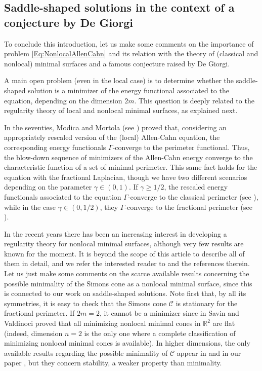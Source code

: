 \documentclass[12pt,reqno]{amsart}
\theoremstyle{definition}
\theoremstyle{remark}
\newcommand{\con}[1]{\mathbb{#1}}
\newcommand{\R}{\con{R}} %
\newcommand{\ccal}{\mathscr{C}}
\newcommand{\s}{\gamma}
\numberwithin{equation}{section}
\begin{document}
\subsection{Saddle-shaped solutions in the context of a conjecture by De Giorgi}
\label{Subsec:DeGiorgi}

To conclude this introduction, let us make some comments on the importance of problem \eqref{Eq:NonlocalAllenCahn} and its relation with the theory of (classical and nonlocal) minimal surfaces and a famous conjecture raised by De Giorgi.

A main open problem (even in the local case) is to determine whether the saddle-shaped solution is a minimizer of the energy functional associated to the equation, depending on the dimension $2m$. This question is deeply related to the regularity theory of local and nonlocal minimal surfaces, as explained next.

In the seventies, Modica and Mortola (see \cite{Modica,ModicaMortola}) proved that, considering an appropriately rescaled version of the (local) Allen-Cahn equation, the corresponding energy functionals $\Gamma$-converge to the perimeter functional. Thus, the blow-down sequence of minimizers of the Allen-Cahn energy converge to the characteristic function of a set of minimal perimeter. This same fact holds for the equation with the fractional Laplacian, though we have two different scenarios depending on the parameter $\s \in (0,1)$. If $\s \geq 1/2$, the rescaled energy functionals associated to the equation $\Gamma$-converge to the classical perimeter (see \cite{GiovanniBouchitteSeppecher,Gonzalez}), while in the case $\s \in (0,1/2)$, they $\Gamma$-converge to the fractional perimeter (see \cite{SavinValdinoci-GammaConvergence}). 

In the recent years there has been an increasing interest in developing a regularity theory for nonlocal minimal surfaces, although very few results are known for the moment. It is beyond the scope of this article to describe all of them in detail, and we refer the interested reader to \cite{CozziFigalli-Survey, BucurValdinoci} and the references therein. Let us just make some comments on the scarce available results concerning the possible minimality of the Simons cone as a nonlocal minimal surface, since this is connected to our work on saddle-shaped solutions. Note first that, by all its symmetries, it is easy to check that the Simons cone $\ccal$ is stationary for the fractional perimeter. If $2m=2$, it cannot be a minimizer since in \cite{SavinValdinoci-Cones} Savin and Valdinoci proved that all minimizing nonlocal minimal cones in $\R^2$ are flat (indeed, dimension $n=2$ is the only one where a complete classification of minimizing nonlocal minimal cones is available). In higher dimensions, the only available results regarding the possible minimality of $\ccal$ appear in \cite{DaviladelPinoWei} and in our paper \cite{Felipe-Sanz-Perela:SaddleFractional}, but they concern stability, a weaker property than minimality. 
\end{document}
